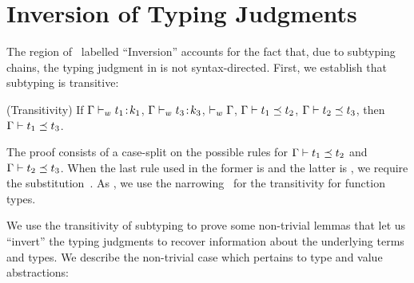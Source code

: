 \section{Inversion of Typing Judgments}
\label{sec:soundness:inversion}

The region of~ labelled ``Inversion''
accounts for the fact that, due to subtyping
chains, the typing judgment in \sysrf is not
syntax-directed.
%
%
First, we establish that subtyping is transitive:

\begin{lemma} (Transitivity) \label{lem:transitivity} 
    If\; ${\mathrm{\Gamma}} \vdash_w {t_1\!} : {\! k_1}$,
       ${\mathrm{\Gamma}} \vdash_w {t_3\!} : {\! k_3}$,
       $\vdash_w {\mathrm{\Gamma}}$,
       ${\mathrm{\Gamma}} \vdash t_1 \preceq t_2$, 
       ${\mathrm{\Gamma}} \vdash t_2 \preceq t_3$, then
       ${\mathrm{\Gamma}} \vdash t_1 \preceq t_3$.
\end{lemma}
%
The proof consists of a case-split
on the possible rules for ${\mathrm{\Gamma}} \vdash t_1 \preceq t_2$
and ${\mathrm{\Gamma}} \vdash t_2 \preceq t_3$.
%
When the last rule used
in the former is \sWitn and the
latter is \sBind, we require the
substitution~.
%
As \citet{Aydemir05},
we use the narrowing~
for the transitivity for function types.

%
We use the transitivity of subtyping to prove
some non-trivial lemmas that let us ``invert''
the typing judgments to recover information
about the underlying terms and types.
%
We describe the non-trivial case which
pertains to type and value abstractions:

